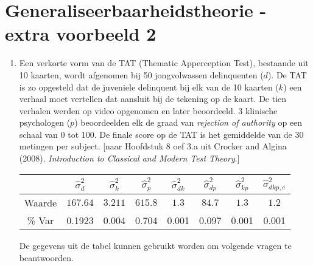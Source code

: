 \OPGAVE
{
\section{Generaliseerbaarheidstheorie - extra voorbeeld 2}

\begin{enumerate}

\item
Een verkorte vorm van de TAT (Thematic Apperception Test), bestaande uit 10 kaarten, wordt afgenomen bij 50
jongvolwassen delinquenten ($d$).
De TAT is zo opgesteld dat de juveniele delinquent bij elk van de 10 kaarten ($k$) een verhaal moet vertellen dat aansluit bij de tekening op de kaart.
De tien verhalen werden op video opgenomen en later beoordeeld.
3 klinische psychologen ($p$) beoordeelden elk de graad van \emph{rejection of authority} op een schaal van 0 tot 100.
De finale score op de TAT is het gemiddelde van de 30 metingen per subject.
[naar Hoofdstuk 8 oef 3.a uit Crocker and Algina (2008). \emph{Introduction to Classical and Modern Test Theory}.]

\begin{center}
\renewcommand{\arraystretch}{1.2}
\begin{tabular}{|c|c|c|c|c|c|c|c|} \hline
 & $ \hat{\sigma}^2_{d} $ & $ \hat{\sigma}^2_{k} $& $ \hat{\sigma}^2_{p} $ & $ \hat{\sigma}^2_{dk} $ & $ \hat{\sigma}^2_{dp} $ & $ \hat{\sigma}^2_{kp} $ & $ \hat{\sigma}^2_{dkp,e} $ \\ \hline
Waarde  & $ 167.64 $ & $ 3.211 $ & $615.8 $ & $ 1.3 $ & $ 84.7 $ & $ 1.3 $ & $ 1.2 $ \\
\% Var & 0.1923& 0.004& 0.704& 0.001& 0.097& 0.001& 0.001 \\ \hline
\end{tabular}
\end{center}

\normalsize
De gegevens uit de tabel kunnen gebruikt worden om volgende vragen te beantwoorden.


\end{enumerate}}
